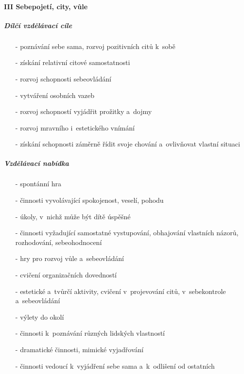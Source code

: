 				\paragraph{III Sebepojetí, city, vůle}
				
					\subparagraph{Dílčí vzdělávací cíle}

					\begin{itemize}
					\setlength\itemsep{-2mm}
						\item[-]poznávání sebe sama, rozvoj pozitivních citů k~sobě
						\item[-]získání relativní citové samostatnosti
						\item[-]rozvoj schopnosti sebeovládání
						\item[-]vytváření osobních vazeb
						\item[-]rozvoj schopností vyjádřit prožitky a~dojmy
						\item[-]rozvoj mravního i~estetického vnímání
						\item[-]získání schopnosti záměrně řídit svoje chování a~ovlivňovat vlastní situaci
					\end{itemize}

					\subparagraph{Vzdělávací nabídka}
					
					\begin{itemize}
					\setlength\itemsep{-2mm}
						\item[-]spontánní hra
						\item[-]činnosti vyvolávající spokojenost, veselí, pohodu
						\item[-]úkoly, v~nichž může být dítě úspěšné
						\item[-]činnosti vyžadující samostatné vystupování, obhajování vlastních názorů, rozhodování, sebeohodnocení
						\item[-]hry pro rozvoj vůle a~sebeovládání
						\item[-]cvičení organizačních dovedností
						\item[-]estetické a~tvůrčí aktivity, cvičení v~projevování citů, v~sebekontrole a~sebeovládání
						\item[-]výlety do okolí
						\item[-]činnosti k~poznávání různých lidských vlastností
						\item[-]dramatické činnosti, mimické vyjadřování
						\item[-]činnosti vedoucí k~vyjádření sebe sama a~k~odlišení od ostatních
					\end{itemize}
					
